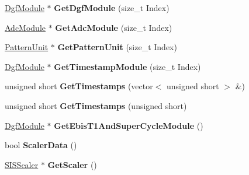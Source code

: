 \begin{DoxyCompactItemize}
\item 
\hypertarget{class_unpacked_event_a3dc0fa2fb893c935047e3fe28e7a0ab3}{\hyperlink{class_dgf_module}{Dgf\-Module} $\ast$ {\bfseries Get\-Dgf\-Module} (size\-\_\-t Index)}\label{class_unpacked_event_a3dc0fa2fb893c935047e3fe28e7a0ab3}

\item 
\hypertarget{class_unpacked_event_a481fd2e7637bb38890e2e12ae51b4bcc}{\hyperlink{class_adc_module}{Adc\-Module} $\ast$ {\bfseries Get\-Adc\-Module} (size\-\_\-t Index)}\label{class_unpacked_event_a481fd2e7637bb38890e2e12ae51b4bcc}

\item 
\hypertarget{class_unpacked_event_a745192df038ac608501642b12e362460}{\hyperlink{class_pattern_unit}{Pattern\-Unit} $\ast$ {\bfseries Get\-Pattern\-Unit} (size\-\_\-t Index)}\label{class_unpacked_event_a745192df038ac608501642b12e362460}

\item 
\hypertarget{class_unpacked_event_afea632b950f2cf8ea9fa04b1f5524c38}{\hyperlink{class_dgf_module}{Dgf\-Module} $\ast$ {\bfseries Get\-Timestamp\-Module} (size\-\_\-t Index)}\label{class_unpacked_event_afea632b950f2cf8ea9fa04b1f5524c38}

\item 
\hypertarget{class_unpacked_event_a7ac2922807426765fc158f7171e6ae06}{unsigned short {\bfseries Get\-Timestamps} (vector$<$ unsigned short $>$ \&)}\label{class_unpacked_event_a7ac2922807426765fc158f7171e6ae06}

\item 
\hypertarget{class_unpacked_event_a1823ddca4adcbc26861072ff45bcc737}{unsigned short {\bfseries Get\-Timestamps} (unsigned short)}\label{class_unpacked_event_a1823ddca4adcbc26861072ff45bcc737}

\item 
\hypertarget{class_unpacked_event_aecb283a228b877c6644ab0da5ba1aa96}{\hyperlink{class_dgf_module}{Dgf\-Module} $\ast$ {\bfseries Get\-Ebis\-T1\-And\-Super\-Cycle\-Module} ()}\label{class_unpacked_event_aecb283a228b877c6644ab0da5ba1aa96}

\item 
\hypertarget{class_unpacked_event_a9a7536c85e4cdbf09e8cd9e8960c67a6}{bool {\bfseries Scaler\-Data} ()}\label{class_unpacked_event_a9a7536c85e4cdbf09e8cd9e8960c67a6}

\item 
\hypertarget{class_unpacked_event_a779dc661d6fe806b5cac503984943439}{\hyperlink{class_s_i_s_scaler}{S\-I\-S\-Scaler} $\ast$ {\bfseries Get\-Scaler} ()}\label{class_unpacked_event_a779dc661d6fe806b5cac503984943439}


\end{DoxyCompactItemize}
